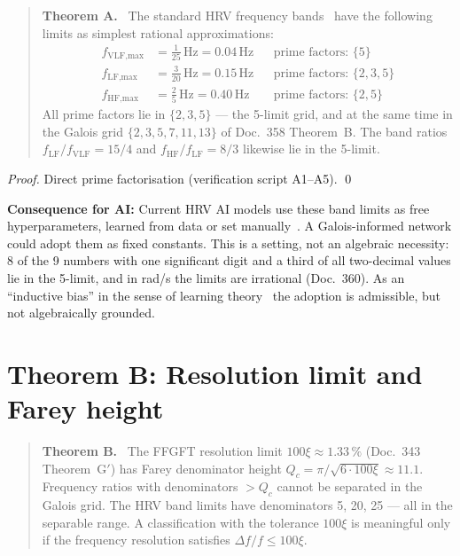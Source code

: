 \begin{quote}
\textbf{Theorem A.} \BM\ The standard HRV frequency bands \LM\,\cite{TaskForce1996}
have the following limits as simplest rational approximations:
\begin{align}
f_\text{VLF,max} &= \tfrac{1}{25}\,\text{Hz} = 0.04\,\text{Hz}
  && \text{prime factors: } \{5\} \\
f_\text{LF,max}  &= \tfrac{3}{20}\,\text{Hz} = 0.15\,\text{Hz}
  && \text{prime factors: } \{2,3,5\} \\
f_\text{HF,max}  &= \tfrac{2}{5}\,\text{Hz} = 0.40\,\text{Hz}
  && \text{prime factors: } \{2,5\}
\end{align}
All prime factors lie in $\{2,3,5\}$ --- the 5-limit grid, and
at the same time in the Galois grid $\{2,3,5,7,11,13\}$ of Doc.~358 Theorem~B.
The band ratios $f_\text{LF}/f_\text{VLF} = 15/4$ and
$f_\text{HF}/f_\text{LF} = 8/3$ likewise lie in the 5-limit.
\end{quote}

\emph{Proof.} Direct prime factorisation (verification script A1--A5). \qed

\textbf{Consequence for AI:} Current HRV AI models use these
band limits as free hyperparameters, learned from data or set
manually \LM\,\cite{Villanueva2026}. A Galois-informed network
could adopt them as fixed constants. This is a setting, not an
algebraic necessity: 8 of the 9 numbers with one significant digit and a
third of all two-decimal values lie in the 5-limit, and in rad/s the
limits are irrational (Doc.~360). As an ``inductive bias'' in the sense
of learning theory \LM\,\cite{ILCRBlog2023} the adoption is admissible,
but not algebraically grounded.

\section{Theorem B: Resolution limit and Farey height}

\begin{quote}
\textbf{Theorem B.} \BM\ The FFGFT resolution limit $100\xi\approx1.33\,\%$
(Doc.~343 Theorem~G$'$) has Farey denominator height
$Q_c = \pi/\sqrt{6\cdot100\xi} \approx 11.1$.
Frequency ratios with denominators $>Q_c$ cannot be separated in the
Galois grid. The HRV band limits have denominators 5, 20, 25 --- all in
the separable range. A classification with the tolerance $100\xi$ is
meaningful only if the frequency resolution satisfies $\Delta f/f\le100\xi$.
\end{quote}

